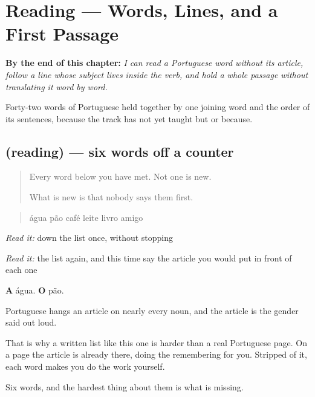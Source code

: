 
\chapter{Reading — Words, Lines, and a First Passage}
\label{ch:pt-primeira-leitura}

\begin{chapteropening}
\textbf{By the end of this chapter:} \emph{I can read a Portuguese word without its article, follow a line whose subject lives inside the verb, and hold a whole passage without translating it word by word.}

Forty-two words of Portuguese held together by one joining word and the order of its sentences, because the track has not yet taught but or because.
\end{chapteropening}

\section[(reading)]{(reading) — six words off a counter}

\label{lesson:PT-C29-palavras}



\begin{quote}
Every word below you have met. Not one is new.

What is new is that nobody says them first.
\end{quote}

\begin{tcolorbox}[breakable,skin=enhanced,colback=orange!6,colframe=orange!45!black,boxrule=0.5pt,arc=1mm,left=6pt,right=6pt,top=4pt,bottom=4pt,fonttitle=\bfseries,title={Read this}]
\begin{quote}
água pão café leite livro amigo
\end{quote}

\emph{Read it:} down the list once, without stopping

\emph{Read it:} the list again, and this time say the article you would put in front of each one

\textbf{A} água. \textbf{O} pão.
\end{tcolorbox}

\begin{culture}
Portuguese hangs an article on nearly every noun, and the article is the gender said out loud.

That is why a written list like this one is harder than a real Portuguese page. On a page the article is already there, doing the remembering for you. Stripped of it, each word makes you do the work yourself.

Six words, and the hardest thing about them is what is missing.
\end{culture}

